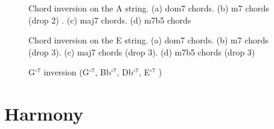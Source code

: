 \documentclass{article}
\begin{document}
\begin{figure}[h!]
	\centering
	\hspace*{-2.2cm}
	\scalebox{0.7}{}
	\hspace*{-2.2cm}
	\scalebox{0.7}{}
	\hspace*{-2.2cm}
	\hspace*{-2.2cm}
	\caption{Chord inversion on the A string. (a) dom7 chords. (b) m7 chords (drop 2) . (c) maj7 chords. (d) m7b5 chords }
	\label{fig}
\end{figure}

\begin{figure}[h!]
	\centering
	\hspace*{-2.2cm}
	\scalebox{0.7}{}
	\hspace*{-2.2cm}
	\scalebox{0.7}{}
	\hspace*{-2.2cm}
	\scalebox{0.7}{}
	\hspace*{-2.2cm}
	\scalebox{0.7}{}
	\caption{Chord inversion on the E string. (a) dom7 chords. (b) m7 chords (drop 3). (c) maj7 chords (drop 3). (d) m7b5 chords (drop 3) }
	\label{fig}
\end{figure}


\begin{figure}[h!]
	\centering
	\hspace*{-2.2cm}
	\scalebox{0.7}{}
	\hspace*{-2.2cm}
	\scalebox{0.7}{}
	\hspace*{-2.2cm}
	\scalebox{0.7}{}
	\caption{G$^{\circ 7}$ inversion (G$^{\circ 7}$, Bb$^{\circ 7}$, Db$^{\circ 7}$, E$^{\circ 7}$ ) }
	\label{fig}
\end{figure}

\clearpage
\section{Harmony}
\end{document}
